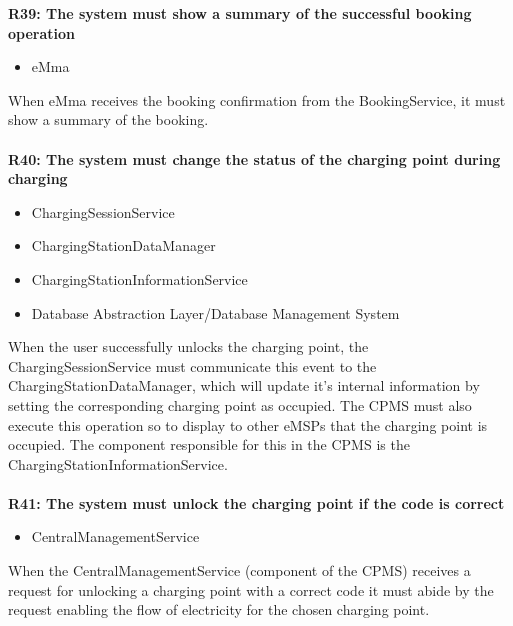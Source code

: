 \textbf{R39: The system must show a summary of the successful booking operation}
\begin{itemize}
	\item eMma
\end{itemize}
When eMma receives the booking confirmation from the BookingService, it must show a summary of the booking.\\
\\
\textbf{R40: The system must change the status of the charging point during charging}
\begin{itemize}
	\item ChargingSessionService
	\item ChargingStationDataManager
    \item ChargingStationInformationService
	\item Database Abstraction Layer/Database Management System
\end{itemize}
When the user successfully unlocks the charging point, the ChargingSessionService must communicate this event to the ChargingStationDataManager, which will update it's internal information by setting the corresponding charging point as occupied. The CPMS must also execute this operation so to display to other eMSPs that the charging point is occupied. The component responsible for this in the CPMS is the ChargingStationInformationService.\\
\\
\textbf{R41: The system must unlock the charging point if the code is correct}
\begin{itemize}
	\item CentralManagementService
\end{itemize}
When the CentralManagementService (component of the CPMS) receives a request for unlocking a charging point with a correct code it must abide by the request enabling the flow of electricity for the chosen charging point.

\clearpage
